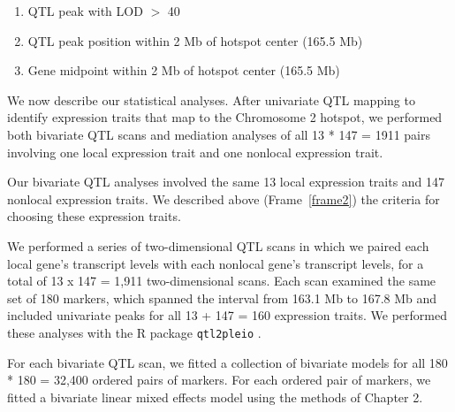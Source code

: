 \documentclass[oneside]{book}\usepackage[]{graphicx}\usepackage[]{color}
\newenvironment{frameenv}[1]
    {\begin{myfloat}[tb]
    \begin{mdframed}[roundcorner=10pt,backgroundcolor=blue!10]
    \caption{#1}
    }
    {%
    \end{mdframed}\end{myfloat}
    }
\begin{document}
\begin{frameenv}{Local gene inclusion criteria}\label{frame2}
\begin{enumerate}
    \item QTL peak with LOD $>$ 40
    \item QTL peak position within 2 Mb of hotspot center (165.5 Mb)
    \item Gene midpoint within 2 Mb of hotspot center (165.5 Mb)
\end{enumerate}
\end{frameenv}




We now describe our statistical analyses. 
After univariate QTL mapping to identify expression traits that 
map to the Chromosome 2 hotspot, 
we performed both bivariate QTL scans and mediation analyses of all 13 * 147 = 1911 pairs
involving one local expression trait and one nonlocal expression trait.




Our bivariate QTL analyses involved the same 13 local expression traits and 147 nonlocal expression traits. 
We described above (Frame~\ref{frame2}) the criteria for choosing these expression traits.

We performed a series of two-dimensional QTL scans in which we paired each local gene's
transcript levels with each nonlocal gene's transcript levels, 
for a total of 13 x 147 = 1,911 two-dimensional scans. 
Each scan examined the same set of 180 markers, which spanned the interval from 163.1 Mb to 167.8 Mb and included univariate peaks for all 13 + 147 = 160 expression traits. 
We performed these analyses with the R package \texttt{qtl2pleio} \citep{qtl2pleio}.

For each bivariate QTL scan, we fitted a collection of bivariate models for 
all 180 * 180 = 32,400 ordered pairs of markers. 
For each ordered pair of markers, we fitted a bivariate linear mixed
effects model using the methods of Chapter 2.

\end{document}
